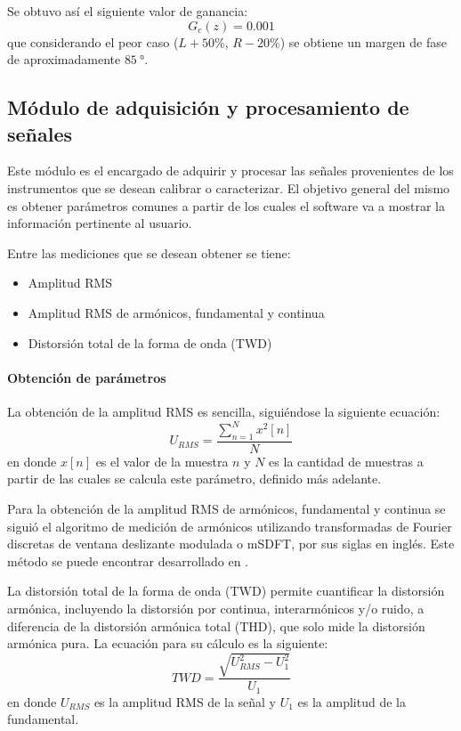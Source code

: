 \documentclass[../et.tex]{subfiles}
\begin{document}
Se obtuvo así el siguiente valor de ganancia:
\[
    G_c(z) = 0.001
\]
que considerando el peor caso ($L + 50\%$, $R - 20\%$) se obtiene un margen de fase de aproximadamente $\SI{85}{\degree}$.

\subsection{Módulo de adquisición y procesamiento de señales}
Este módulo es el encargado de adquirir y procesar las señales provenientes de los instrumentos que se desean calibrar o caracterizar. El objetivo general del mismo es obtener parámetros comunes a partir de los cuales el software va a mostrar la información pertinente al usuario.

Entre las mediciones que se desean obtener se tiene:
    \begin{itemize}
        \item Amplitud RMS
        \item Amplitud RMS de armónicos, fundamental y continua
        \item Distorsión total de la forma de onda (TWD)
    \end{itemize}


\paragraph{Obtención de parámetros}
La obtención de la amplitud RMS es sencilla, siguiéndose la siguiente ecuación:
\[
    U_{RMS} = \frac{\sum_{n = 1}^{N}x^2[n]}{N}
\]
en donde $x[n]$ es el valor de la muestra $n$ y $N$ es la cantidad de muestras a partir de las cuales se calcula este parámetro, definido más adelante.

Para la obtención de la amplitud RMS de armónicos, fundamental y continua se siguió el algoritmo de medición de armónicos utilizando transformadas de Fourier discretas de ventana deslizante modulada o mSDFT, por sus siglas en inglés. Este método se puede encontrar desarrollado en \cite{msdft-paper}.

La distorsión total de la forma de onda (TWD) permite cuantificar la distorsión armónica, incluyendo la distorsión por continua, interarmónicos y/o ruido, a diferencia de la distorsión armónica total (THD), que solo mide la distorsión armónica pura. La ecuación para su cálculo es la siguiente:
\[
    TWD = \frac{\sqrt{U_{RMS}^2 - U_1^2}}{U_1}
\]
en donde $U_{RMS}$ es la amplitud RMS de la señal y $U_1$ es la amplitud de la fundamental.
\end{document}
